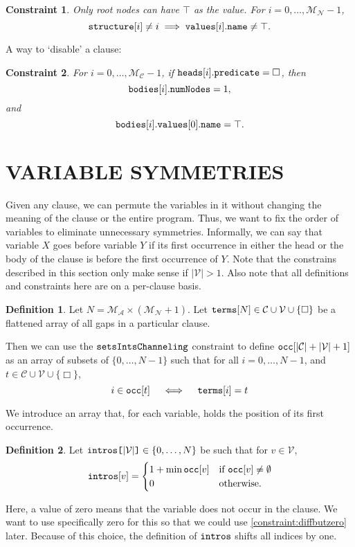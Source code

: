 \documentclass[letterpaper]{article}
\newtheorem{constraint}{Constraint}
\theoremstyle{definition}
\newtheorem{definition}{Definition}
\newcommand{\variable}[1]{\texttt{\textup{#1}}}
\newcommand{\arrayd}[3]{\variable{{#1}[}{#2}\variable{]} \in {#3}}
\newcommand{\variables}{\mathcal{V}}
\newcommand{\constants}{\mathcal{C}}
\newcommand{\maxArity}{\mathcal{M}_{\mathcal{A}}}
\newcommand{\maxNumNodes}{\mathcal{M}_{\mathcal{N}}}
\newcommand{\maxNumClauses}{\mathcal{M}_{\mathcal{C}}}
\begin{document}
\begin{constraint}
  Only root nodes can have $\top$ as the value. For $i = 0, \dots,
  \maxNumNodes{} - 1$,
  \[
    \variable{structure}[i] \ne i \implies
    \variable{values}[i].\variable{name} \ne \top.
  \]
\end{constraint}

A way to `disable' a clause:
\begin{constraint}
  For $i = 0, \dots, \maxNumClauses{} - 1$, if
  $\variable{heads}[i].\variable{predicate} = \Box$, then
  \[
    \variable{bodies}[i].\variable{numNodes} = 1,
  \]
  and
  \[
    \variable{bodies}[i].\variable{values}[0].\variable{name} =
    \top.
  \]
\end{constraint}

\section{VARIABLE SYMMETRIES} \label{sec:variable_symmetry}

Given any clause, we can permute the variables in it without changing the
meaning of the clause or the entire program. Thus, we want to fix the order of
variables to eliminate unnecessary symmetries. Informally, we can say that
variable $X$ goes before variable $Y$ if its first occurrence in either the head
or the body of the clause is before the first occurrence of $Y$. Note that the
constrains described in this section only make sense if $|\variables| > 1$. Also
note that all definitions and constraints here are on a per-clause basis.

\begin{definition}
  Let $N = \maxArity{} \times (\maxNumNodes{} + 1)$. Let
  $\variable{terms}[N] \in \constants{} \cup \variables{} \cup \{ \Box
  \}$ be a flattened array of all gaps in a particular clause.

  Then we can use the $\variable{setsIntsChanneling}$ constraint
  to define $\variable{occ}[|\constants{}| + |\variables{}| + 1]$ as an
  array of subsets of $\{ 0, \dots, N-1 \}$ such that for all $i = 0, \dots, N
  - 1$, and $t \in \constants{} \cup \variables{} \cup \{ \Box \}$,
  \[
    i \in \variable{occ}[t] \quad \iff \quad
    \variable{terms}[i] = t
  \]
\end{definition}

We introduce an array that, for each variable, holds the position of its first
occurrence.
\begin{definition}
  Let $\arrayd{intros}{|\variables{}|}{\{ 0, \dots, N \}}$ be such that
  for $v \in \variables{}$,
  \[
    \variable{intros}[v] = \begin{cases}
      1 + \min \variable{occ}[v] & \text{if }
      \variable{occ}[v] \ne \emptyset\\
      0 & \text{otherwise.}
    \end{cases}
  \]
\end{definition}
Here, a value of zero means that the variable does not occur in the clause. We
want to use specifically zero for this so that we could use
\cref{constraint:diffbutzero} later. Because of this choice, the definition of
$\variable{intros}$ shifts all indices by one.
\end{document}
